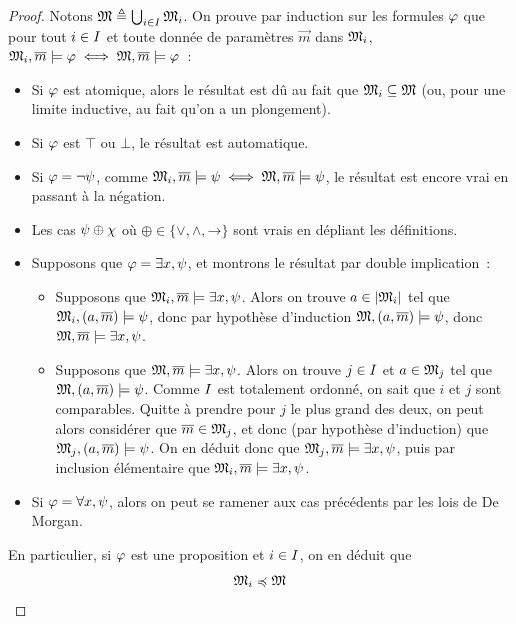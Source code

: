 \begin{proof}
  Notons $\mathfrak{M}\triangleq \bigcup_{i \in I}\mathfrak{M}_i$.
  On prouve par induction sur les formules $\varphi$ que pour tout
  $i \in I$ et toute donnée de paramètres $\vec m$ dans $\mathfrak{M}_i$,
  $\mathfrak{M}_i,\overline{m}\models\varphi\iff\mathfrak{M},\overline{m}\models\varphi$~:
  \begin{itemize}
  \item Si $\varphi$ est atomique, alors le résultat est dû au fait que
    $\mathfrak{M}_i\subseteq\mathfrak{M}$ (ou, pour une limite inductive, au fait qu'on a un
    plongement).
  \item Si $\varphi$ est $\top$ ou $\bot$, le résultat est automatique.
  \item Si $\varphi = \lnot\psi$, comme
    $\mathfrak{M}_i,\overline{m}\models\psi\iff\mathfrak{M},\overline{m}\models\psi$, le résultat
    est encore vrai en passant à la négation.
  \item Les cas $\psi\oplus\chi$ où
    $\oplus\in\{\mathord{\lor},\mathord{\land},\mathord{\to}\}$ sont
    vrais en dépliant les définitions.
  \item Supposons que $\varphi = \exists x, \psi$, et montrons le résultat
    par double implication~:
    \begin{itemize}
    \item[\fbox{$\Rightarrow$}] Supposons que
      $\mathfrak{M}_i,\overline{m}\models\exists x, \psi$. Alors on trouve
      $a\in\left\vert \mathfrak{M}_i\right\vert$ tel que $\mathfrak{M}_i,(a,\overline{m})\models\psi$,
      donc par hypothèse d'induction $\mathfrak{M},(a,\overline{m})\models\psi$, donc
      $\mathfrak{M},\overline{m}\models\exists x, \psi$.
    \item[\fbox{$\Leftarrow$}] Supposons que
      $\mathfrak{M},\overline{m}\models\exists x, \psi$. Alors on trouve
      $j\in I$ et $a \in \mathfrak{M}_j$ tel que
      $\mathfrak{M},(a,\overline{m})\models\psi$. Comme $I$ est totalement ordonné,
      on sait que $i$ et $j$ sont comparables. Quitte à prendre pour $j$ le
      plus grand des deux, on peut alors considérer que $\overline{m} \in\mathfrak{M}_j$,
      et donc (par hypothèse d'induction) que
      $\mathfrak{M}_j,(a,\overline{m})\models\psi$. On en déduit donc que
      $\mathfrak{M}_j,\overline{m}\models\exists x, \psi$, puis par inclusion élémentaire
      que $\mathfrak{M}_i,\overline{m}\models\exists x, \psi$.
    \end{itemize}
  \item Si $\varphi = \forall x, \psi$, alors on peut se ramener aux cas
    précédents par les lois de De Morgan.
  \end{itemize}
  En particulier, si $\varphi$ est une proposition et $i\in I$, on en
  déduit que
  \[\mathfrak{M}_i\preccurlyeq\mathfrak{M}\qedhere\]
\end{proof}

